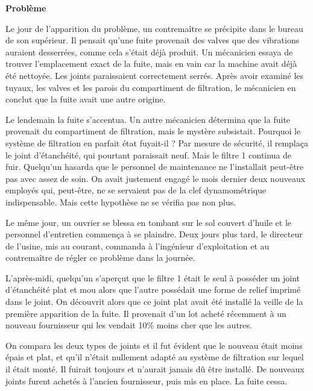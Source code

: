 \textbf{	Problème}
\vspace{0.3cm}

Le jour de l’apparition du problème, un contremaître se précipite dans le bureau de son supérieur. Il pensait qu’une fuite provenait des valves que des vibrations auraient desserrées, comme cela s’était déjà produit. Un mécanicien essaya de trouver l’emplacement exact de la fuite, mais en vain car la machine avait déjà été nettoyée. Les joints paraissaient correctement serrés. Après avoir examiné les tuyaux, les valves et les parois du compartiment de filtration, le mécanicien en conclut que la fuite avait une autre origine.
\vspace{0.3cm}

Le lendemain la fuite s’accentua. Un autre mécanicien détermina que la fuite provenait du compartiment de filtration, mais le mystère subsistait. Pourquoi le système de filtration en parfait état fuyait-il ? Par mesure de sécurité, il remplaça le joint d’étanchéité, qui pourtant paraissait neuf. Mais le filtre 1 continua de fuir. Quelqu’un hasarda que le personnel de maintenance ne l’installait peut-être pas avec assez de soin. On avait justement engagé le mois dernier deux nouveaux employés qui, peut-être, ne se servaient pas de la clef dynamométrique indispensable. Mais cette hypothèse ne se vérifia pas non plus.
\vspace{0.3cm}

Le même jour, un ouvrier se blessa en tombant sur le sol couvert d’huile et le personnel d’entretien commença à se plaindre. Deux jours plus tard, le directeur de l’usine, mis au courant, commanda à l’ingénieur d’exploitation et au contremaître de régler ce problème dans la journée.
\vspace{0.3cm}

L’après-midi, quelqu’un s’aperçut que le filtre 1 était le seul à posséder un joint d’étanchéité plat et mou alors que l’autre possédait une forme de relief imprimé dans le joint. On découvrit alors que ce joint plat avait été installé la veille de la première apparition de la fuite. Il provenait d’un lot acheté récemment à un nouveau fournisseur qui les vendait 10\% moins cher que les autres.
\vspace{0.3cm}

On compara les deux types de joints et il fut évident que le nouveau était moins épais et plat, et qu’il n’était nullement adapté au système de filtration sur lequel il était monté. Il fuirait toujours et n’aurait jamais dû être installé. De nouveaux joints furent achetés à l’ancien fournisseur, puis mis en place. La fuite cessa.
\vspace{0.3cm}

